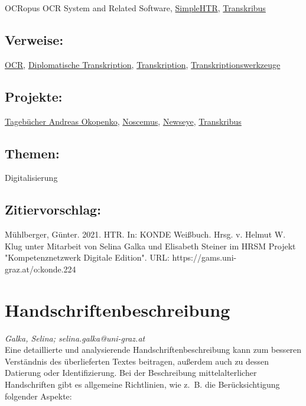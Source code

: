 \documentclass{article}
\begin{document}
{                           OCRopus OCR System and Related Software}, \href{https://github.com/githubharald/SimpleHTR}{SimpleHTR}, \href{https://transkribus.eu/Transkribus/}{Transkribus}\subsection*{Verweise:}\href{https://gams.uni-graz.at/o:konde.149}{OCR}, \href{https://gams.uni-graz.at/o:konde.66}{Diplomatische Transkription}, \href{https://gams.uni-graz.at/o:konde.197}{Transkription}, \href{https://gams.uni-graz.at/o:konde.199}{Transkriptionswerkzeuge}\subsection*{Projekte:}\href{https://edition.onb.ac.at/okopenko/context:okopenko/methods/sdef:Context/get}{Tagebücher Andreas Okopenko}, \href{https://www.uibk.ac.at/projects/noscemus/}{Noscemus}, \href{http://newseye.eu/}{Newseye}, \href{https://readcoop.eu/transkribus/}{Transkribus}\subsection*{Themen:}Digitalisierung\subsection*{Zitiervorschlag:}Mühlberger, Günter. 2021. HTR. In: KONDE Weißbuch. Hrsg. v. Helmut W. Klug unter Mitarbeit von Selina Galka und Elisabeth Steiner im HRSM Projekt "Kompetenznetzwerk Digitale Edition". URL: https://gams.uni-graz.at/o:konde.224\newpage\section*{Handschriftenbeschreibung} \emph{Galka, Selina; selina.galka@uni-graz.at }\\
        
    Eine detaillierte und analysierende Handschriftenbeschreibung kann zum besseren
                  Verständnis des überlieferten Textes beitragen, außerdem auch zu dessen Datierung
                  oder Identifizierung. Bei der Beschreibung mittelalterlicher Handschriften gibt es
                  allgemeine Richtlinien, wie z. B. die Berücksichtigung folgender Aspekte:\\
            
\end{document}

